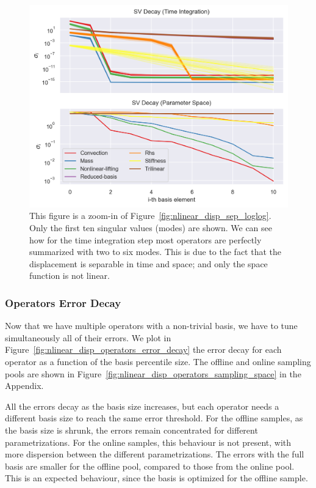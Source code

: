 \documentclass[../../thesis.tex]{subfiles}
\begin{document}
\begin{figure}[h]
    \includegraphics[width =\columnwidth]{research_project/piston/figures/nonlinear_displacement/separable/sigmas_logy.png}
    \caption{This figure is a zoom-in of Figure~\ref{fig:nlinear_disp_sep_loglog}.
    Only the first ten singular values (modes) are shown.
    We can see how for the time integration step most operators 
    are perfectly summarized with two to six modes.
    This is due to the fact that the displacement is separable in time and space;
    and only the space function is not linear.}
    \label{fig:nlinear_disp_sep_logy}
\end{figure}

\subsubsection{Operators Error Decay}
Now that we have multiple operators with a non-trivial basis, 
we have to tune simultaneously all of their errors.
We plot in Figure~\ref{fig:nlinear_disp_operators_error_decay}
the error decay for each operator as a function of the basis percentile size.
The offline and online sampling pools are shown in
Figure~\ref{fig:nlinear_disp_operators_sampling_space} in the Appendix.

All the errors decay as the basis size increases, 
but each operator needs a different basis size to reach the same error threshold.
For the offline samples, as the basis size is shrunk, 
the errors remain concentrated for different parametrizations.
For the online samples, this behaviour is not present, 
with more dispersion between the different parametrizations.
The errors with the full basis are smaller for the offline pool, 
compared to those from the online pool.
This is an expected behaviour, 
since the basis is optimized for the offline sample.
\end{document}
